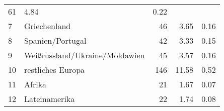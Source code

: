 \begin{longtable}{lXrrr}
       \num{61} &
       \num[round-mode=places,round-precision=2]{4,84} &
         \num[round-mode=places,round-precision=2]{0,22} \\

     7 &
     \multicolumn{1}{X}{ Griechenland   } &


       \num{46} &
       \num[round-mode=places,round-precision=2]{3,65} &
         \num[round-mode=places,round-precision=2]{0,16} \\

     8 &
     \multicolumn{1}{X}{ Spanien/Portugal   } &


       \num{42} &
       \num[round-mode=places,round-precision=2]{3,33} &
         \num[round-mode=places,round-precision=2]{0,15} \\

     9 &
     \multicolumn{1}{X}{ Weißrussland/Ukraine/Moldawien   } &


       \num{45} &
       \num[round-mode=places,round-precision=2]{3,57} &
         \num[round-mode=places,round-precision=2]{0,16} \\

     10 &
     \multicolumn{1}{X}{ restliches Europa   } &


       \num{146} &
       \num[round-mode=places,round-precision=2]{11,58} &
         \num[round-mode=places,round-precision=2]{0,52} \\

     11 &
     \multicolumn{1}{X}{ Afrika   } &


       \num{21} &
       \num[round-mode=places,round-precision=2]{1,67} &
         \num[round-mode=places,round-precision=2]{0,07} \\

     12 &
     \multicolumn{1}{X}{ Lateinamerika   } &


       \num{22} &
       \num[round-mode=places,round-precision=2]{1,74} &
         \num[round-mode=places,round-precision=2]{0,08} \\


\end{longtable}
